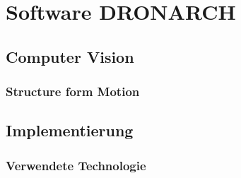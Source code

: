 \chapter{Software DRONARCH}
	\section{Computer Vision}
		\subsection{Structure form Motion} \label{sfm}
	\section{Implementierung}
		\subsection{Verwendete Technologie}
